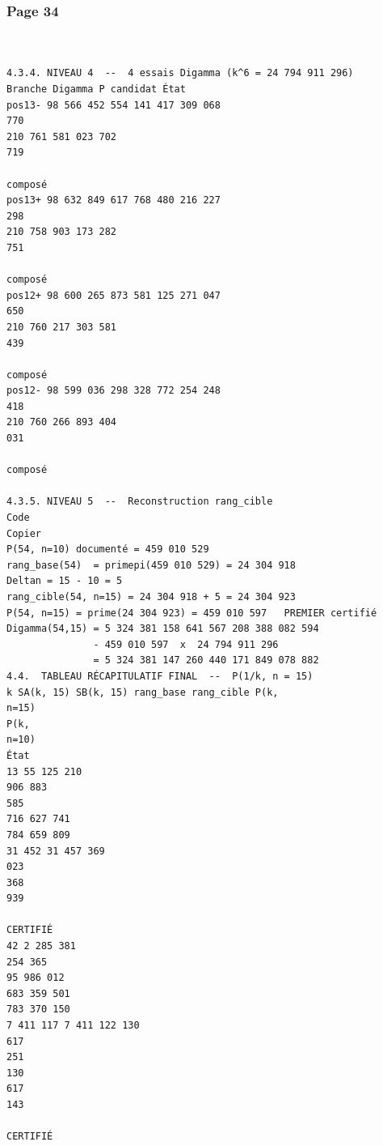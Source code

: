 \documentclass[11pt,a4paper]{article}
\begin{document}
\subsubsection*{Page 34}
\begin{Verbatim}[fontsize=\footnotesize]
 
 
4.3.4. NIVEAU 4  --  4 essais Digamma (k^6 = 24 794 911 296) 
Branche Digamma P candidat État 
pos13- 98 566 452 554 141 417 309 068 
770 
210 761 581 023 702 
719 
  
composé 
pos13+ 98 632 849 617 768 480 216 227 
298 
210 758 903 173 282 
751 
  
composé 
pos12+ 98 600 265 873 581 125 271 047 
650 
210 760 217 303 581 
439 
  
composé 
pos12- 98 599 036 298 328 772 254 248 
418 
210 760 266 893 404 
031 
  
composé 
 
4.3.5. NIVEAU 5  --  Reconstruction rang_cible 
Code 
Copier 
P(54, n=10) documenté = 459 010 529 
rang_base(54)  = primepi(459 010 529) = 24 304 918 
Deltan = 15 - 10 = 5 
rang_cible(54, n=15) = 24 304 918 + 5 = 24 304 923 
P(54, n=15) = prime(24 304 923) = 459 010 597   PREMIER certifié 
Digamma(54,15) = 5 324 381 158 641 567 208 388 082 594 
               - 459 010 597  x  24 794 911 296 
               = 5 324 381 147 260 440 171 849 078 882 
4.4.  TABLEAU RÉCAPITULATIF FINAL  --  P(1/k, n = 15) 
k SA(k, 15) SB(k, 15) rang_base rang_cible P(k, 
n=15) 
P(k, 
n=10) 
État 
13 55 125 210 
906 883 
585 
716 627 741 
784 659 809 
31 452 31 457 369 
023 
368 
939 
   
CERTIFIÉ 
42 2 285 381 
254 365 
95 986 012 
683 359 501 
783 370 150 
7 411 117 7 411 122 130 
617 
251 
130 
617 
143 
   
CERTIFIÉ 
\end{Verbatim}
\medskip
\end{document}
